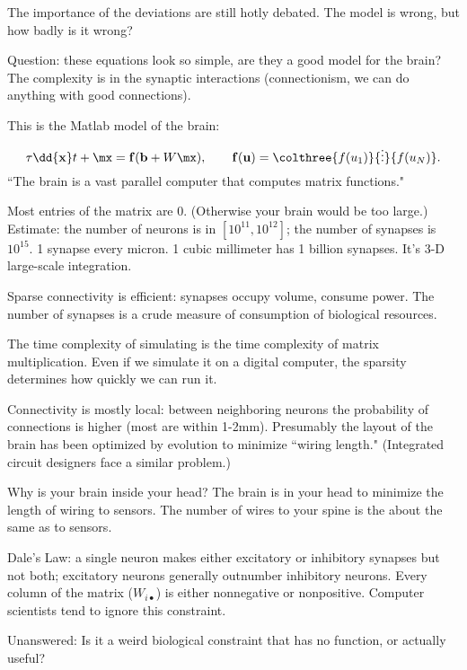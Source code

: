 The importance of the deviations are still hotly debated. The model is wrong, but how badly is it wrong?

Question: these equations look so simple, are they a good model for the brain? The complexity is in the synaptic interactions (connectionism, we can do anything with good connections).

This is the Matlab model of the brain:
\[
\tau \dd{\mathbf x}t+\mx = \mathbf f(\mathbf b+W\mx),\qquad \mathbf f(\mathbf u)=\colthree{f(u_1)}{\vdots}{f(u_N)}.
\]
``The brain is a vast parallel computer that computes matrix functions."

Most entries of the matrix are 0. (Otherwise your brain would be too large.) Estimate: the number of neurons is in $[10^{11}, 10^{12}]$; the number of synapses is $10^{15}$. 1 synapse every micron. 1 cubic millimeter has 1 billion synapses. It's 3-D large-scale integration.

Sparse connectivity is efficient: synapses occupy volume, consume power. The number of synapses is a crude measure of consumption of biological resources.

The time complexity of simulating is the time complexity of matrix multiplication. Even if we simulate it on a digital computer, the sparsity determines how quickly we can run it.

Connectivity is mostly local: between neighboring neurons the probability of connections is higher (most are within 1-2mm). Presumably the layout of the brain has been optimized by evolution to minimize ``wiring length." (Integrated circuit designers face a similar problem.)

Why is your brain inside your head? The brain is in your head to minimize the length of wiring to sensors. The number of wires to your spine is the about the same as to sensors.

Dale's Law: a single neuron makes either excitatory or inhibitory synapses but not both; excitatory  neurons generally outnumber inhibitory neurons. Every column of the matrix ($W_{i\bullet}$) is either nonnegative or nonpositive. Computer scientists tend to ignore this constraint.

Unanswered: Is it a weird biological constraint that has no function, or actually useful?

%
 
%
%
